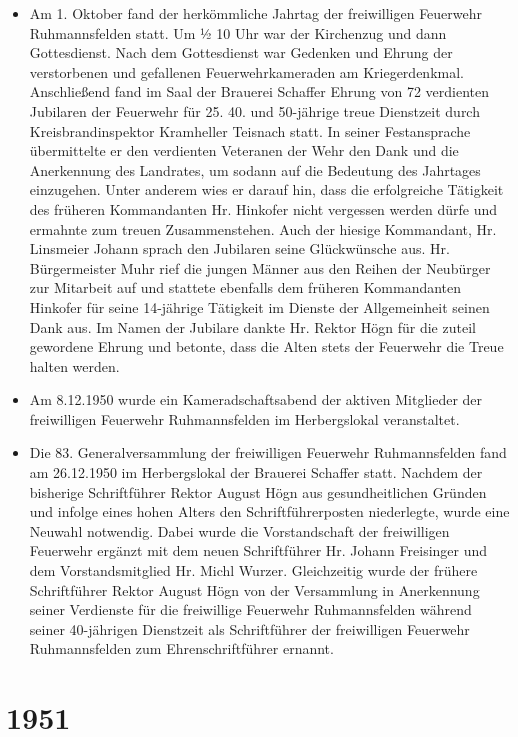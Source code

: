 \documentclass[12pt,a4paper]{book}
\begin{document}
\begin{itemize}
\item Am 1. Oktober fand der herkömmliche Jahrtag der freiwilligen Feuerwehr
Ruhmannsfelden statt. Um ½ 10 Uhr war der Kirchenzug und dann Gottesdienst. Nach
dem Gottesdienst war Gedenken und Ehrung der verstorbenen und gefallenen
Feuerwehrkameraden am Kriegerdenkmal. Anschließend fand im Saal der Brauerei
Schaffer Ehrung von 72 verdienten Jubilaren der Feuerwehr für 25. 40. und
50-jährige treue Dienstzeit durch Kreisbrandinspektor Kramheller Teisnach statt.
In seiner Festansprache übermittelte er den verdienten Veteranen der Wehr den
Dank und die Anerkennung des Landrates, um sodann auf die Bedeutung des
Jahrtages einzugehen. Unter anderem wies er darauf hin, dass die erfolgreiche
Tätigkeit des früheren Kommandanten Hr. Hinkofer nicht vergessen werden dürfe
und ermahnte zum treuen Zusammenstehen. Auch der hiesige Kommandant, Hr.
Linsmeier Johann sprach den Jubilaren seine Glückwünsche aus. Hr. Bürgermeister
Muhr rief die jungen Männer aus den Reihen der Neubürger zur Mitarbeit auf und
stattete ebenfalls dem früheren Kommandanten Hinkofer für seine 14-jährige
Tätigkeit im Dienste der Allgemeinheit seinen Dank aus. Im Namen der Jubilare
dankte Hr. Rektor Högn für die zuteil gewordene Ehrung und betonte, dass die
Alten stets der Feuerwehr die Treue halten werden.

\item Am 8.12.1950 wurde ein Kameradschaftsabend der aktiven Mitglieder der
freiwilligen Feuerwehr Ruhmannsfelden im Herbergslokal veranstaltet.

\item Die 83. Generalversammlung der freiwilligen Feuerwehr Ruhmannsfelden fand
am 26.12.1950 im Herbergslokal der Brauerei Schaffer statt. Nachdem der
bisherige Schriftführer Rektor August Högn aus gesundheitlichen Gründen und
infolge eines hohen Alters den Schriftführerposten niederlegte, wurde eine
Neuwahl notwendig. Dabei wurde die Vorstandschaft der freiwilligen Feuerwehr
ergänzt mit dem neuen Schriftführer Hr. Johann Freisinger und dem
Vorstandsmitglied Hr. Michl Wurzer. Gleichzeitig wurde der frühere Schriftführer
Rektor August Högn von der Versammlung in Anerkennung seiner Verdienste für die
freiwillige Feuerwehr Ruhmannsfelden während seiner 40-jährigen Dienstzeit als
Schriftführer der freiwilligen Feuerwehr Ruhmannsfelden zum Ehrenschriftführer
ernannt.
\end{itemize}

\section*{1951}
\end{document}

